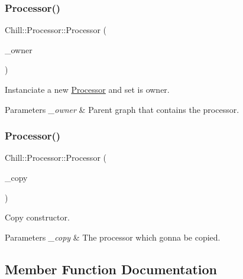 \subsubsection{\texorpdfstring{Processor()}{Processor()}\hspace{0.1cm}{\footnotesize\ttfamily [3/4]}}
{\footnotesize\ttfamily Chill\+::\+Processor\+::\+Processor (\begin{DoxyParamCaption}\item[{\mbox{\hyperlink{class_chill_1_1_processing_graph}{Processing\+Graph}} $\ast$}]{\+\_\+owner }\end{DoxyParamCaption})\hspace{0.3cm}{\ttfamily [inline]}}

Instanciate a new \mbox{\hyperlink{class_chill_1_1_processor}{Processor}} and set is owner. 
\begin{DoxyParams}{Parameters}
{\em \+\_\+owner} & Parent graph that contains the processor. \\
\hline
\end{DoxyParams}
\mbox{\label{class_chill_1_1_processor_a36d7f0ccee9cfa13fbe58cee33619521}} 
\subsubsection{\texorpdfstring{Processor()}{Processor()}\hspace{0.1cm}{\footnotesize\ttfamily [4/4]}}
{\footnotesize\ttfamily Chill\+::\+Processor\+::\+Processor (\begin{DoxyParamCaption}\item[{const \mbox{\hyperlink{class_chill_1_1_processor}{Processor}} \&}]{\+\_\+copy }\end{DoxyParamCaption})}

Copy constructor. 
\begin{DoxyParams}{Parameters}
{\em \+\_\+copy} & The processor which gonna be copied. \\
\hline
\end{DoxyParams}


\subsection{Member Function Documentation}
\mbox{\label{class_chill_1_1_processor_a771c81e8f921566a6ee719845c2f1e23}} 
